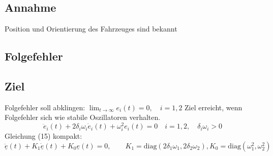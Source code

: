 \documentclass[ngerman]{tudscrreprt}
\begin{document}
\subsection*{Annahme} Position und Orientierung des Fahrzeuges sind bekannt
\subsection*{Folgefehler} 
\subsection*{Ziel} Folgefehler soll abklingen: $\lim_{t\to \infty} e_i(t)= 0, \quad i =1,2$
Ziel erreicht, wenn Folgefehler sich wie stabile Oszillatoren verhalten. 
\begin{equation*}
\ddot{e}_i(t) + 2\delta_i \omega_i \dot{e}_i(t) + \omega_i^2 e_i(t) = 0 \quad i =1,2,\quad \delta_i \omega_i > 0 
\tag{15}
\end{equation*}
Gleichung (15) kompakt: 
\begin{equation*}
\underline{\ddot{e}}(t) + K_1 \underline{\dot{e}}(t) + K_0 \underline{e}(t) = 0, \qquad K_1 = \text{diag}(2\delta_1\omega_1, 2\delta_2\omega_2), K_0 = \text{diag}(\omega_1^2, \omega_2^2)
\end{equation*}
\end{document}
